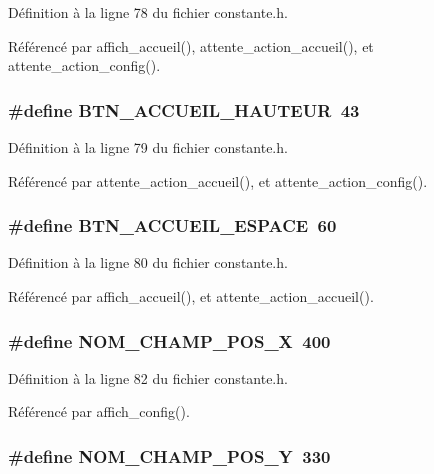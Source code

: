 D\'{e}finition \`{a} la ligne 78 du fichier constante.h.

R\'{e}f\'{e}renc\'{e} par affich\_\-accueil(), attente\_\-action\_\-accueil(), et attente\_\-action\_\-config().
\subsubsection{\setlength{\rightskip}{0pt plus 5cm}\#define BTN\_\-ACCUEIL\_\-HAUTEUR~43}\label{constante_8h_95ce6f56d63a3029218c497ddd5bae55}




D\'{e}finition \`{a} la ligne 79 du fichier constante.h.

R\'{e}f\'{e}renc\'{e} par attente\_\-action\_\-accueil(), et attente\_\-action\_\-config().
\subsubsection{\setlength{\rightskip}{0pt plus 5cm}\#define BTN\_\-ACCUEIL\_\-ESPACE~60}\label{constante_8h_a7e3e1c3981f5bfd9775f5f74014bba3}




D\'{e}finition \`{a} la ligne 80 du fichier constante.h.

R\'{e}f\'{e}renc\'{e} par affich\_\-accueil(), et attente\_\-action\_\-accueil().
\subsubsection{\setlength{\rightskip}{0pt plus 5cm}\#define NOM\_\-CHAMP\_\-POS\_\-X~400}\label{constante_8h_ca3ba76b8e96078377bfc674caf96905}




D\'{e}finition \`{a} la ligne 82 du fichier constante.h.

R\'{e}f\'{e}renc\'{e} par affich\_\-config().
\subsubsection{\setlength{\rightskip}{0pt plus 5cm}\#define NOM\_\-CHAMP\_\-POS\_\-Y~330}\label{constante_8h_edb8af22330f096a126730b262f208a3}




